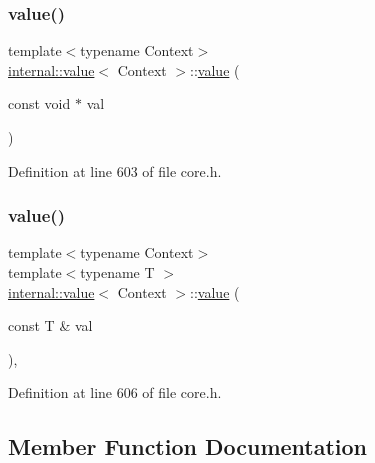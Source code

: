 \mbox{\label{classinternal_1_1value_acf3509a16c38533d3fc583086b73505e}} 
\subsubsection{\texorpdfstring{value()}{value()}\hspace{0.1cm}{\footnotesize\ttfamily [11/12]}}
{\footnotesize\ttfamily template$<$typename Context$>$ \\
\hyperlink{classinternal_1_1value}{internal\+::value}$<$ Context $>$\+::\hyperlink{classinternal_1_1value}{value} (\begin{DoxyParamCaption}\item[{const void $\ast$}]{val }\end{DoxyParamCaption})\hspace{0.3cm}{\ttfamily [inline]}}



Definition at line 603 of file core.\+h.

\mbox{\label{classinternal_1_1value_ae8ae97a2e4fe75ae2916044362bf7319}} 
\subsubsection{\texorpdfstring{value()}{value()}\hspace{0.1cm}{\footnotesize\ttfamily [12/12]}}
{\footnotesize\ttfamily template$<$typename Context$>$ \\
template$<$typename T $>$ \\
\hyperlink{classinternal_1_1value}{internal\+::value}$<$ Context $>$\+::\hyperlink{classinternal_1_1value}{value} (\begin{DoxyParamCaption}\item[{const T \&}]{val }\end{DoxyParamCaption})\hspace{0.3cm}{\ttfamily [inline]}, {\ttfamily [explicit]}}



Definition at line 606 of file core.\+h.



\subsection{Member Function Documentation}
\mbox{\label{classinternal_1_1value_a071197c0d0a2e48940fac7a961587850}} 
